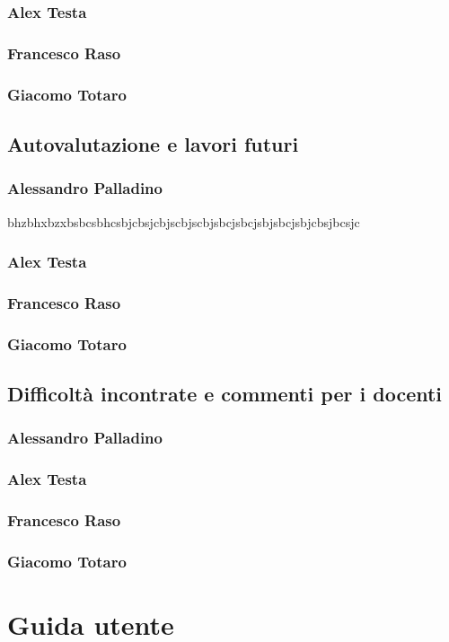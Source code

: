 \documentclass[a4paper,12pt]{report}
\begin{document}
    
    \subsection*{Alex Testa}
    
    
    \subsection*{Francesco Raso}
    
    
    \subsection*{Giacomo Totaro}
    
    
\section{Autovalutazione e lavori futuri}
    \subsection*{Alessandro Palladino}
    bhzbhxbzxbsbcsbhcsbjcbsjcbjscbjscbjsbcjsbcjsbjsbcjsbjcbsjbcsjc
    
    \subsection*{Alex Testa}
    
    
    \subsection*{Francesco Raso}
    
    
    \subsection*{Giacomo Totaro}
    
    
\section{Difficoltà incontrate e commenti per i docenti}
    \subsection*{Alessandro Palladino}
    
    
    \subsection*{Alex Testa}
    
    
    \subsection*{Francesco Raso}
    
    
    \subsection*{Giacomo Totaro}
    
    

\appendix
\chapter{Guida utente} 
\end{document}
